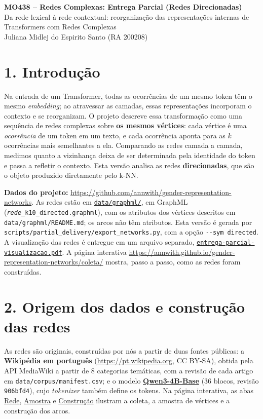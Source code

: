 \documentclass[11pt,a4paper]{article}
\newcommand{\repo}{https://github.com/annwith/gender-representation-networks}
\newcommand{\dados}{\repo/tree/main/data/graphml}
\newcommand{\visual}{\repo/blob/main/report/entrega-parcial-visualizacao/entrega-parcial-visualizacao.pdf}
\newcommand{\coleta}{https://annwith.github.io/gender-representation-networks/coleta/}
\begin{document}
\begin{center}
    {\large\bfseries MO438 -- Redes Complexas: Entrega Parcial (Redes Direcionadas)}\\[2pt]
    Da rede lexical à rede contextual: reorganização das representações
    internas de Transformers com Redes Complexas\\[2pt]
    Juliana Midlej do Espirito Santo (RA 200208)
\end{center}

\vspace{-2mm}

\section*{1. Introdução}

Na entrada de um Transformer, todas as ocorrências de um mesmo token têm o mesmo
\textit{embedding}; ao atravessar as camadas, essas representações incorporam o contexto e
se reorganizam. O projeto descreve essa transformação como uma sequência de redes complexas
sobre \textbf{os mesmos vértices}: cada vértice é uma \textit{ocorrência} de um token em um
texto, e cada ocorrência aponta para as $k$ ocorrências mais semelhantes a ela. Comparando as
redes camada a camada, medimos quanto a vizinhança deixa de ser determinada pela identidade
do token e passa a refletir o contexto. Esta versão analisa as redes \textbf{direcionadas},
que são o objeto produzido diretamente pelo k-NN.

\textbf{Dados do projeto:} \url{\repo}. As redes estão em
\href{\dados}{\nolinkurl{data/graphml/}}, em GraphML
(\texttt{\textit{rede}\_k10\_directed.graphml}), com os atributos dos
vértices descritos em \nolinkurl{data/graphml/README.md}; os arcos não têm atributos. Esta
versão é gerada por \nolinkurl{scripts/partial_delivery/export_networks.py}, com a opção
\texttt{-{}-sym directed}. A visualização das redes é entregue em um arquivo
separado, \href{\visual}{\texttt{entrega-parcial-visualizacao.pdf}}. A página interativa
\mbox{\url{\coleta}} mostra, passo a passo, como as redes foram construídas.

\section*{2. Origem dos dados e construção das redes}

As redes são originais, construídas por nós a partir de duas fontes públicas: a
\textbf{Wikipédia em português} (\url{https://pt.wikipedia.org}, CC BY-SA), obtida pela
API MediaWiki a partir de 8 categorias temáticas, com a revisão de cada artigo em
\texttt{data/corpus/manifest.csv}; e o modelo
\href{https://huggingface.co/Qwen/Qwen3-4B-Base}{\textbf{Qwen3-4B-Base}} (36 blocos,
revisão \texttt{906bfd4}), cujo \textit{tokenizer} também define os tokens. Na página interativa,
as abas \href{\coleta}{Rede}, \href{\coleta\#amostra}{Amostra} e
\href{\coleta\#construcao}{Construção} ilustram a coleta, a amostra de vértices e a construção
dos arcos.
\end{document}
